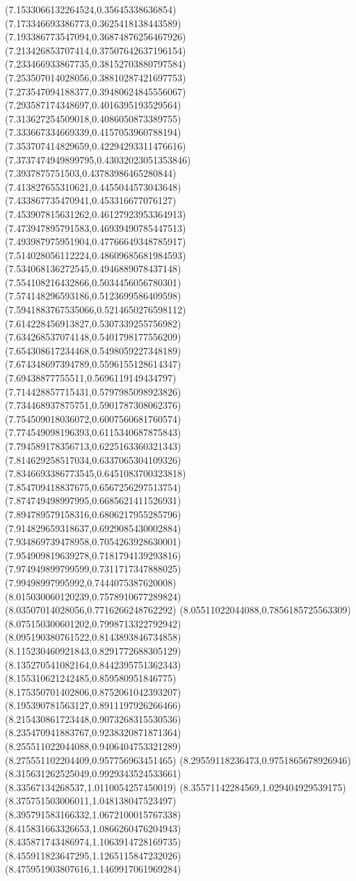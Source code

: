 {(7.1533066132264524,0.35645338636854)
(7.173346693386773,0.3625418138443589)
(7.193386773547094,0.36874876256467926)
(7.213426853707414,0.37507642637196154)
(7.233466933867735,0.38152703880797584)
(7.253507014028056,0.38810287421697753)
(7.273547094188377,0.39480624845556067)
(7.293587174348697,0.4016395193529564)
(7.313627254509018,0.4086050873389755)
(7.333667334669339,0.4157053960788194)
(7.353707414829659,0.42294293311476616)
(7.3737474949899795,0.43032023051353846)
(7.3937875751503,0.43783986465280844)
(7.413827655310621,0.4455044573043648)
(7.433867735470941,0.453316677076127)
(7.453907815631262,0.46127923953364913)
(7.473947895791583,0.46939490785447513)
(7.493987975951904,0.47766649348785917)
(7.514028056112224,0.48609685681984593)
(7.534068136272545,0.4946889078437148)
(7.554108216432866,0.5034456056780301)
(7.574148296593186,0.5123699586409598)
(7.5941883767535066,0.5214650276598112)
(7.614228456913827,0.5307339255756982)
(7.634268537074148,0.5401798177556209)
(7.654308617234468,0.5498059227348189)
(7.674348697394789,0.5596155128614347)
(7.69438877755511,0.5696119149434797)
(7.714428857715431,0.5797985098923826)
(7.734468937875751,0.5901787308062376)
(7.754509018036072,0.6007560681760574)
(7.774549098196393,0.6115340687875843)
(7.794589178356713,0.6225163360321343)
(7.814629258517034,0.6337065304109326)
(7.8346693386773545,0.6451083700323818)
(7.854709418837675,0.6567256297513754)
(7.874749498997995,0.6685621411526931)
(7.894789579158316,0.6806217955285796)
(7.914829659318637,0.6929085430002884)
(7.934869739478958,0.7054263928630001)
(7.954909819639278,0.7181794139293816)
(7.974949899799599,0.7311717347888025)
(7.99498997995992,0.7444075387620008)
(8.015030060120239,0.7578910677289824)
(8.03507014028056,0.7716266248762292)
(8.05511022044088,0.7856185725563309)
(8.075150300601202,0.7998713322792942)
(8.095190380761522,0.8143893846734858)
(8.115230460921843,0.8291772688305129)
(8.135270541082164,0.8442395751362343)
(8.155310621242485,0.859580951846775)
(8.175350701402806,0.8752061042393207)
(8.195390781563127,0.8911197926266466)
(8.215430861723448,0.9073268315530536)
(8.235470941883767,0.9238320871871364)
(8.255511022044088,0.9406404753321289)
(8.275551102204409,0.957756963451465)
(8.29559118236473,0.9751865678926946)
(8.315631262525049,0.9929343524533661)
(8.33567134268537,1.0110054257450019)
(8.35571142284569,1.029404929539175)
(8.375751503006011,1.048138047523497)
(8.395791583166332,1.0672100015767338)
(8.415831663326653,1.0866260476204943)
(8.435871743486974,1.1063914728169735)
(8.455911823647295,1.1265115847232026)
(8.475951903807616,1.1469917061969284)
}
